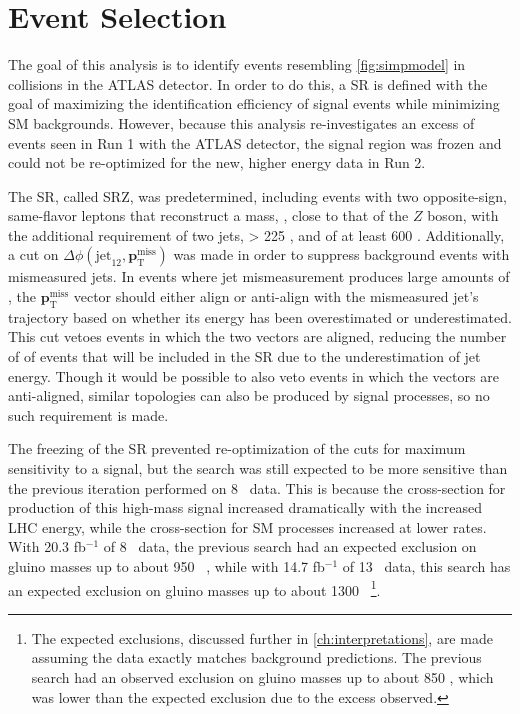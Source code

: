 
\chapter{Event Selection} %
\label{ch:eventsel} 

The goal of this analysis is to identify events resembling \autoref{fig:simpmodel} in collisions in the \ac{ATLAS} detector. In order to do this, a \acf{SR} is defined with the goal of maximizing the identification efficiency of signal events while minimizing \ac{SM} backgrounds. However, because this analysis re-investigates an excess of events seen in Run 1 with the \ac{ATLAS} detector, the signal region was frozen and could not be re-optimized for the new, higher energy data in Run 2. 

The \ac{SR}, called SRZ, was predetermined, including events with two opposite-sign, same-flavor leptons that reconstruct a mass, \mll, close to that of the $Z$ boson, with the additional requirement of two jets, \met > 225 \gev, and \HT of at least 600 \gev. Additionally, a cut on $\Delta\phi(\text{jet}_{12},{\boldsymbol p}_{\mathrm{T}}^{\mathrm{miss}})$ was made in order to suppress \dyjets background events with mismeasured jets. In events where jet mismeasurement produces large amounts of \met, the ${\boldsymbol p}_{\mathrm{T}}^{\mathrm{miss}}$ vector should either align or anti-align with the mismeasured jet's trajectory based on whether its energy has been overestimated or underestimated. This cut vetoes events in which the two vectors are aligned, reducing the number of of events that will be included in the \ac{SR} due to the underestimation of jet energy. Though it would be possible to also veto events in which the vectors are anti-aligned, similar topologies can also be produced by signal processes, so no such requirement is made. 

The freezing of the \ac{SR} prevented re-optimization of the cuts for maximum sensitivity to a signal, but the search was still expected to be more sensitive than the previous iteration performed on 8 \tev~data. This is because the cross-section for production of this high-mass signal increased dramatically with the increased \ac{LHC} energy, while the cross-section for \ac{SM} processes increased at lower rates. With 20.3 fb$^{-1}$ of 8 \tev~data, the previous search had an expected exclusion on gluino masses up to about 950 \gev~\cite{SUSY-2014-10}, while with 14.7 fb$^{-1}$ of 13 \tev~data, this search has an expected exclusion on gluino masses up to about 1300 \gev~\footnote{The expected exclusions, discussed further in \autoref{ch:interpretations}, are made assuming the data exactly matches background predictions. The previous search had an observed exclusion on gluino masses up to about 850 \gev, which was lower than the expected exclusion due to the excess observed.}.

